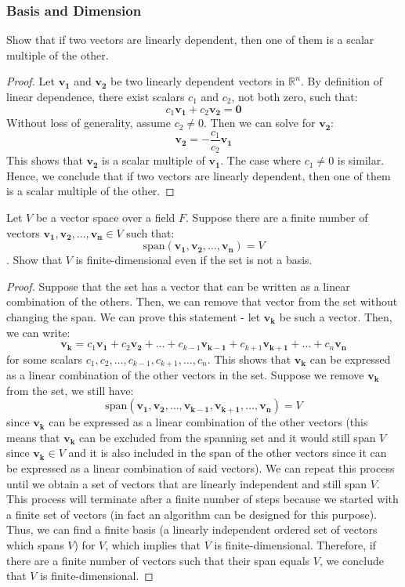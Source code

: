 \documentclass[openany]{book}
\begin{document}
\subsubsection{Basis and Dimension}
\begin{exercise}
    Show that if two vectors are linearly dependent, then one of them is a scalar multiple of the other.
\end{exercise}
\begin{proof}
    Let $\mathbf{v_1}$ and $\mathbf{v_2}$ be two linearly dependent vectors in $\mathbb{R}^n$. By definition of linear dependence, there exist scalars $c_1$ and $c_2$, not both zero, such that:
    $$c_1 \mathbf{v_1} + c_2 \mathbf{v_2} = \mathbf{0}$$
    Without loss of generality, assume $c_2 \neq 0$. Then we can solve for $\mathbf{v_2}$:
    $$\mathbf{v_2} = -\frac{c_1}{c_2} \mathbf{v_1}$$
    This shows that $\mathbf{v_2}$ is a scalar multiple of $\mathbf{v_1}$. The case where $c_1 \neq 0$ is similar. Hence, we conclude that if two vectors are linearly dependent, then one of them is a scalar multiple of the other.
\end{proof}
\begin{exercise}
    Let $V$ be a vector space over a field $F$. Suppose there are a finite number of vectors $\mathbf{v_1}, \mathbf{v_2}, \ldots, \mathbf{v_n} \in V$ such that:
    $$\text{span}(\mathbf{v_1}, \mathbf{v_2}, \ldots, \mathbf{v_n}) = V$$. Show that $V$ is finite-dimensional even if the set is not a basis.
\end{exercise}
\begin{proof}
    Suppose that the set has a vector that can be written as a linear combination of the others. Then, we can remove that vector from the set without changing the span. We can prove this statement - let $\mathbf{v_k}$ be such a vector. Then, we can write:
    $$\mathbf{v_k} = c_1 \mathbf{v_1} + c_2 \mathbf{v_2} + \ldots + c_{k-1} \mathbf{v_{k-1}} + c_{k+1} \mathbf{v_{k+1}} + \ldots + c_n \mathbf{v_n}$$
    for some scalars $c_1, c_2, \ldots, c_{k-1}, c_{k+1}, \ldots, c_n$. This shows that $\mathbf{v_k}$ can be expressed as a linear combination of the other vectors in the set. Suppose we remove $\mathbf{v_k}$ from the set, we still have:
    $$\text{span}(\mathbf{v_1}, \mathbf{v_2}, \ldots, \mathbf{v_{k-1}}, \mathbf{v_{k+1}}, \ldots, \mathbf{v_n}) = V$$
    since $\mathbf{v_k}$ can be expressed as a linear combination of the other vectors (this means that $\mathbf{v_k}$ can be excluded from the spanning set and it would still span $V$ since $\mathbf{v_k} \in V$ and it is also included in the span of the other vectors since it can be expressed as a linear combination of said vectors). We can repeat this process until we obtain a set of vectors that are linearly independent and still span $V$. This process will terminate after a finite number of steps because we started with a finite set of vectors (in fact an algorithm can be designed for this purpose). Thus, we can find a finite basis (a linearly independent ordered set of vectors which spans $V$) for $V$, which implies that $V$ is finite-dimensional.
    Therefore, if there are a finite number of vectors such that their span equals $V$, we conclude that $V$ is finite-dimensional.
\end{proof}
\end{document}
